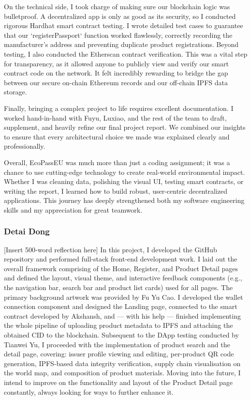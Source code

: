 \documentclass[runningheads]{llncs}
\begin{document}
	On the technical side, I took charge of making sure our blockchain logic was bulletproof. A decentralized app is only as good as its security, so I conducted rigorous Hardhat smart contract testing. I wrote detailed test cases to guarantee that our `registerPassport` function worked flawlessly, correctly recording the manufacturer's address and preventing duplicate product registrations. Beyond testing, I also conducted the Etherscan contract verification. This was a vital step for transparency, as it allowed anyone to publicly view and verify our smart contract code on the network. It felt incredibly rewarding to bridge the gap between our secure on-chain Ethereum records and our off-chain IPFS data storage. 
	
	Finally, bringing a complex project to life requires excellent documentation. I worked hand-in-hand with Fuyu, Luxiao, and the rest of the team to draft, supplement, and heavily refine our final project report. We combined our insights to ensure that every architectural choice we made was explained clearly and professionally.
	
	Overall, EcoPassEU was much more than just a coding assignment; it was a chance to use cutting-edge technology to create real-world environmental impact. Whether I was cleaning data, polishing the visual UI, testing smart contracts, or writing the report, I learned how to build robust, user-centric decentralized applications. This journey has deeply strengthened both my software engineering skills and my appreciation for great teamwork.
	
	
	\subsubsection{Detai Dong}
	[Insert 500-word reflection here]
	In this project, I developed the GitHub repository and performed full-stack front-end development work. I laid out the overall framework  comprising of the Home, Register, and Product Detail pages and defined the layout, visual theme, and interactive feedback components (e.g., the navigation bar, search bar and product list cards) used for all pages. The primary background artwork was provided by Fu Yu Cao. I developed the wallet connection component and designed the Landing page, connected to the smart contract developed by Akshansh, and — with his help — finished implementing the whole pipeline of uploading product metadata to IPFS and attaching the obtained CID to the blockchain. Subsequent to the DApp testing conducted by Tianwei Yu, I proceeded with the implementation of product search and the detail page, covering: issuer profile viewing and editing, per-product QR code generation, IPFS-based data integrity verification, supply chain visualisation on the world map, and composition of product materials. Moving into the future, I intend to improve on the functionality and layout of the Product Detail page constantly, always looking for ways to further enhance it.
	
\end{document}
